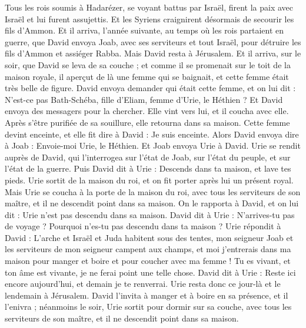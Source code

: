 \begin{multicols}{2}
Tous les rois soumis à Hadarézer, se voyant battus par Israël, firent la paix avec Israël et lui furent assujettis. Et les Syriens craignirent désormais de secourir les fils d'Ammon.
\VerseOne{}Et il arriva, l'année suivante, au temps où les rois partaient en guerre, que David envoya Joab, avec ses serviteurs et tout Israël, pour détruire les fils d'Ammon et assiéger Rabba. Mais David resta à Jérusalem.
Et il arriva, sur le soir, que David se leva de sa couche ; et comme il se promenait sur le toit de la maison royale, il aperçut de là une femme qui se baignait, et cette femme était très belle de figure.
David envoya demander qui était cette femme, et on lui dit : N'est-ce pas Bath-Schéba, fille d'Eliam, femme d'Urie, le Héthien ?
Et David envoya des messagers pour la chercher. Elle vint vers lui, et il coucha avec elle. Après s'être purifiée de sa souillure, elle retourna dans sa maison.
Cette femme devint enceinte, et elle fit dire à David : Je suis enceinte.
Alors David envoya dire à Joab : Envoie-moi Urie, le Héthien. Et Joab envoya Urie à David.
Urie se rendit auprès de David, qui l'interrogea sur l'état de Joab, sur l'état du peuple, et sur l'état de la guerre.
Puis David dit à Urie : Descends dans ta maison, et lave tes pieds. Urie sortit de la maison du roi, et on fit porter après lui un présent royal.
Mais Urie se coucha à la porte de la maison du roi, avec tous les serviteurs de son maître, et il ne descendit point dans sa maison.
On le rapporta à David, et on lui dit : Urie n'est pas descendu dans sa maison. David dit à Urie : N'arrives-tu pas de voyage ? Pourquoi n'es-tu pas descendu dans ta maison ?
Urie répondit à David : L'arche et Israël et Juda habitent sous des tentes, mon seigneur Joab et les serviteurs de mon seigneur campent aux champs, et moi j'entrerais dans ma maison pour manger et boire et pour coucher avec ma femme ! Tu es vivant, et ton âme est vivante, je ne ferai point une telle chose.
David dit à Urie : Reste ici encore aujourd'hui, et demain je te renverrai. Urie resta donc ce jour-là et le lendemain à Jérusalem.
David l'invita à manger et à boire en sa présence, et il l'enivra ; néanmoins le soir, Urie sortit pour dormir sur sa couche, avec tous les serviteurs de son maître, et il ne descendit point dans sa maison.

\end{multicols}
